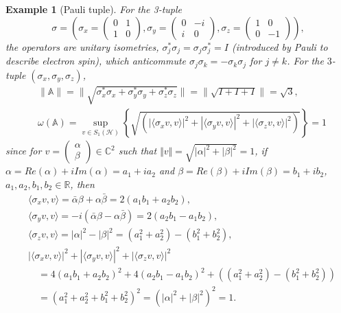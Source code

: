 \documentclass[12pt]{article}
\newtheorem{example}{Example}
\begin{document}
\begin{example}[Pauli tuple]
For the 3-tuple \[\mathbb{\sigma} = (\sigma_x=\begin{pmatrix}
  0 & 1 \\
  1 & 0
\end{pmatrix}, \sigma_y=\begin{pmatrix}
 0 & -i \\
  i & 0
\end{pmatrix}, \sigma_z=\begin{pmatrix}
  1 & 0 \\
  0 & -1
\end{pmatrix}),\]
the operators are unitary isometries, $\sigma_j^*\sigma_j=\sigma_j\sigma_j^*=I$ (introduced by Pauli to describe electron spin), which anticommute $\sigma_j\sigma_k = - \sigma_k\sigma_j$  for $j\neq k$.
For the $3$-tuple $(\sigma_x, \sigma_y, \sigma_z)$,
\begin{align*}
& \|\mathbb{A}\| = \|\sqrt{\sigma_x^*\sigma_x+\sigma_y^*\sigma_y+\sigma_z^*\sigma_z}\|=\|\sqrt{I+I+I}\| = \sqrt{3}, \\
& \omega(\mathbb{A}) =
        \sup\limits_{v \in S_{1}(\mathcal{H})} \left\{
            \sqrt{\left(|\langle \sigma_x v, v\rangle|^{2} +|\langle \sigma_y v, v\rangle|^{2} +|\langle \sigma_z v, v\rangle|^{2} \right)}
        \right\}=1
\end{align*}
since for $v = \begin{pmatrix} \alpha \\ \beta \end{pmatrix} \in \mathbb{C}^2$ such that $\Vert v \Vert=\sqrt{|\alpha|^2+|\beta|^2}=1$,
if $\alpha =Re(\alpha)+iIm(\alpha)=a_1 + ia_2 $ and $\beta =Re(\beta)+iIm(\beta)=b_1 + ib_2$, $a_1, a_2, b_1, b_2 \in \mathbb{R}$, then
\begin{align*}
 &  \langle \sigma_x v, v \rangle = \bar{\alpha}\beta + \alpha\bar{\beta} = 2(a_1b_1 + a_2b_2), \\
& \langle \sigma_y v, v \rangle = -i(\bar{\alpha}\beta - \alpha\bar{\beta}) = 2(a_2b_1-a_1b_2), \\
 &   \langle \sigma_z v, v \rangle = |\alpha|^2 - |\beta|^2 = (a_1^2 + a_2^2) - (b_1^2 + b_2^2), \\
& |\langle\sigma_x v, v\rangle|^{2} + |\langle \sigma_y v, v\rangle|^{2} + |\langle \sigma_z v, v\rangle|^{2} \\
& \quad =4(a_1b_1 + a_2b_2)^2+4(a_2b_1-a_1b_2)^2 + ((a_1^2 + a_2^2) - (b_1^2 + b_2^2))\\
& \quad =(a_1^2 + a_2^2 + b_1^2 + b_2^2)^2=(|\alpha|^2+|\beta|^2)^2 = 1.

\end{align*}
\end{example}
\end{document}
